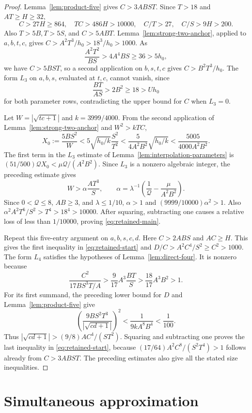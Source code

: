 \documentclass[12pt]{article}
\numberwithin{equation}{section}
\begin{document}
\begin{proof}
Lemma~\ref{lem:product-five} gives \(C>3ABST\). Since \(T>18\) and \(AT\ge H\ge32\),
\[
 C>27H\ge864,\quad TC>486H>10000,\quad
 C/T>27,\quad C/S>9H>200.
\]
Also \(T>5B,T>5S\), and \(C>5ABT\). Lemma~\ref{lem:strong-two-anchor},
applied to \(a,b,t,c\), gives \(C>A^2T^3/h_0>18^3/h_0>1000\).
As
\[
 \frac{A^2T^2}{BS}>4A^4BS\ge36>5h_0,
\]
we have \(C>5BST\), so a second application on \(b,s,t,c\) gives
\(C>B^2T^3/h_0\).
The form \(L_3\) on \(a,b,s\), evaluated at \(t,c\), cannot vanish, since
\[
 \frac{BT}{AS}>2B^2\ge18>Uh_0
\]
for both parameter rows, contradicting the upper bound for \(C\) when \(L_3=0\).

Let \(W=|\sqrt{tc+1}|\) and \(k=3999/4000\). From the second application of Lemma~\ref{lem:strong-two-anchor}
and \(W^2>kTC\),
\[
 X_0:=\frac{5BS^2}{W}
 <5\sqrt{h_0/k}\frac{S^2}{T^2}
 <\frac5{4A^2B^2}\sqrt{h_0/k}
 <\frac{5005}{4000A^2B^2}.
\]
The first term in the \(L_3\) estimate of
Lemma~\ref{lem:interpolation-parameters} is
\((51/500)\mathcal QX_0<\mu\mathcal Q/(A^2B^2)\).
Since \(L_3\) is a nonzero algebraic integer, the preceding estimate gives
\[
 W>\alpha\frac{AT^3}{S},\qquad
 \alpha=\lambda^{-1}\left(\frac1{\mathcal Q}
                              -\frac{\mu}{A^2B^2}\right).
\]
Since \(0<\mathcal Q\le8\), \(AB\ge3\), and \(\lambda\le1/10\),
\(\alpha>1\) and \((9999/10000)\alpha^2>1\).
Also \(\alpha^2A^2T^6/S^2>T^4>18^4>10000\).
After squaring, subtracting one causes a relative loss of less than \(1/10000\),
proving \eqref{eq:retained-main}.

Repeat this five-entry argument on \(a,b,s,c,d\). Here
\(C>2ABS\) and \(AC\ge H\). This gives the first inequality in
\eqref{eq:retained-start} and \(D/C>A^2C^4/S^2\ge C^2>1000\).
The form \(L_4\) satisfies the hypotheses of Lemma~\ref{lem:direct-four}.
It is nonzero because
\[
 \frac{C^2}{17BS^3T/A}>
 \frac9{17}A^3\frac{BT}{S}>
 \frac{18}{17}A^3B^2>1.
\]
For its first summand, the preceding lower bound for \(D\) and
Lemma~\ref{lem:product-five} give
\[
 \left(\frac{9BS^2T^3}{|\sqrt{cd+1}|}\right)^2
 <\frac1{9kA^8B^4}<\frac1{100}.
\]
Thus \(|\sqrt{cd+1}|>(9/8)AC^4/(ST^2)\). Squaring and subtracting
one proves the last inequality in \eqref{eq:retained-start}, because
\((17/64)A^2C^8/(S^2T^4)>1\) follows already from \(C>3ABST\).
The preceding estimates also give all the stated size inequalities.
\end{proof}

\section{Simultaneous approximation}
\end{document}
